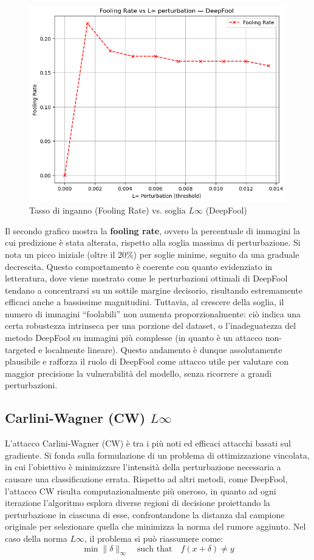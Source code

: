                 \begin{figure}[H]
                    \centering
                    \includegraphics[width=0.6\linewidth]{images/fooling_rate_deepfool.png}
                    \caption{Tasso di inganno (Fooling Rate) vs. soglia $L\infty$ (DeepFool)}
                \end{figure}
                
                \noindent Il secondo grafico mostra la \textbf{fooling rate}, ovvero la percentuale di immagini la cui predizione è stata alterata, rispetto alla soglia massima di perturbazione. Si nota un picco iniziale (oltre il 20\%) per soglie minime, seguito da una graduale decrescita. Questo comportamento è coerente con quanto evidenziato in letteratura, dove viene mostrato come le perturbazioni ottimali di DeepFool tendano a concentrarsi su un sottile margine decisorio, risultando estremamente efficaci anche a bassissime magnitudini. Tuttavia, al crescere della soglia, il numero di immagini ``foolabili'' non aumenta proporzionalmente: ciò indica una certa robustezza intrinseca per una porzione del dataset, o l’inadeguatezza del metodo DeepFool su immagini più complesse (in quanto è un attacco non-targeted e localmente lineare).
                Questo andamento è dunque assolutamente plausibile e rafforza il ruolo di DeepFool come attacco utile per valutare con maggior precisione la vulnerabilità del modello, senza ricorrere a grandi perturbazioni.
            
        \subsection{Carlini-Wagner (CW) $L\infty$}
            \noindent L’attacco Carlini-Wagner (CW) è tra i più noti ed efficaci attacchi basati sul gradiente. Si fonda sulla formulazione di un problema di ottimizzazione vincolata, in cui l’obiettivo è minimizzare l’intensità della perturbazione necessaria a causare una classificazione errata.
            Rispetto ad altri metodi, come DeepFool, l’attacco CW risulta computazionalmente più oneroso, in quanto ad ogni iterazione l’algoritmo esplora diverse regioni di decisione proiettando la perturbazione in ciascuna di esse, confrontandone la distanza dal campione originale per selezionare quella che minimizza la norma del rumore aggiunto.
            Nel caso della norma $L\infty$, il problema si può riassumere come:
            \[
            \min \| \delta \|_\infty \quad \text{such that} \quad f(x + \delta) \ne y
            \]
            
